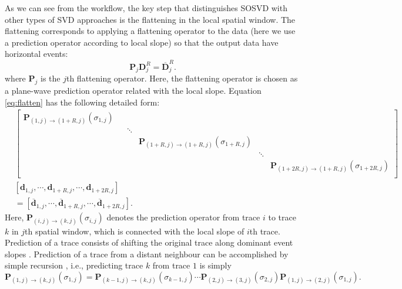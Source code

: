 As we can see from the workflow, the key step that distinguishes SOSVD with other types of SVD approaches is the flattening in the local spatial window. The flattening corresponds to applying a flattening operator to the data (here we use a prediction operator according to local slope) so that the output data have horizontal events:
\begin{equation}
\label{eq:flatten}
 \mathbf{P}_j \mathbf{D}_j^R= \overline{\mathbf{D}}_j^R.
\end{equation}
where $\mathbf{P}_j$ is the $j$th flattening operator. Here, the flattening operator is chosen as a plane-wave prediction operator related with the local slope. 
Equation \ref{eq:flatten} has the following detailed form:
\begin{equation}
\label{eq:detail}
\begin{split}
& \left[
\begin{array}{cccccc}
\mathbf{P}_{(1,j)\rightarrow(1+R,j)}(\sigma_{1,j}) &  & & & & \\
 &  & \ddots & & & \\
 &  & & \mathbf{P}_{(1+R,j)\rightarrow(1+R,j)}(\sigma_{1+R,j}) & & \\
 &  & & & \ddots & \\
 &  & & & & \mathbf{P}_{(1+2R,j)\rightarrow(1+R,j)}(\sigma_{1+2R,j})\\
\end{array}
\right]\\
&[\mathbf{d}_{1,j},\cdots,\mathbf{d}_{1+R,j}, \cdots, \mathbf{d}_{1+2R,j}]\\
&=[\overline{\mathbf{d}}_{1,j},\cdots,\overline{\mathbf{d}}_{1+R,j}, \cdots, \overline{\mathbf{d}}_{1+2R,j}]. 
\end{split}
\end{equation}
Here, $\mathbf{P}_{(i,j)\rightarrow(k,j)}(\sigma_{i,j})$ denotes the prediction operator from trace $i$ to trace $k$ in $j$th spatial window, which is connected with the local slope of $i$th trace.  Prediction of a trace consists of shifting the original trace along dominant event slopes \cite[]{fomel2010painting}.  
Prediction of a trace from a distant neighbour can be accomplished by simple recursion \cite[]{liuyang2010}, i.e., predicting trace $k$ from trace $1$ is simply
\begin{equation}
\label{eq:recur}
\mathbf{P}_{(1,j)\rightarrow(k,j)} (\sigma_{1,j})= \mathbf{P}_{(k-1,j)\rightarrow(k,j)}(\sigma_{k-1,j})\cdots\mathbf{P}_{(2,j)\rightarrow(3,j)}(\sigma_{2,j})\mathbf{P}_{(1,j)\rightarrow(2,j)}(\sigma_{1,j}).
\end{equation}

